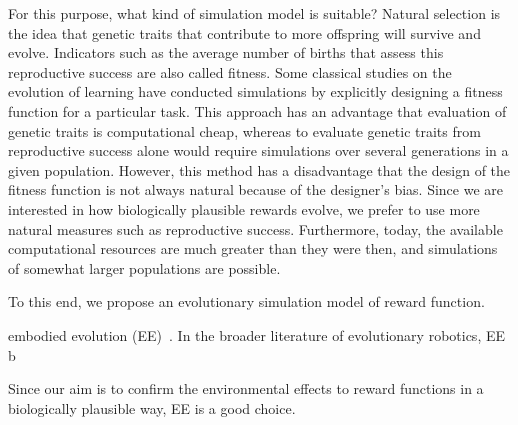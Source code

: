 For this purpose, what kind of simulation model is suitable? Natural selection is the idea that genetic traits that contribute to more offspring will survive and evolve. Indicators such as the average number of births that assess this reproductive success are also called fitness. Some classical studies on the evolution of learning \citep{hintonHowLearningCan1987} have conducted simulations by explicitly designing a fitness function for a particular task. This approach has an advantage that evaluation of genetic traits is computational cheap, whereas to evaluate genetic traits from reproductive success alone would require simulations over several generations in a given population. However, this method has a disadvantage that the design of the fitness function is not always natural because of the designer's bias. Since we are interested in how biologically plausible rewards evolve, we prefer to use more natural measures such as reproductive success. Furthermore, today, the available computational resources are much greater than they were then, and simulations of somewhat larger populations are possible.

To this end, we propose an evolutionary simulation model of reward function.

embodied evolution (EE)~\cite{watsonEmbodiedEvolutionDistributing2002}.
In the broader literature of evolutionary robotics, EE b

Since our aim is to confirm the environmental effects to reward functions in a biologically plausible way, EE is a good choice.



